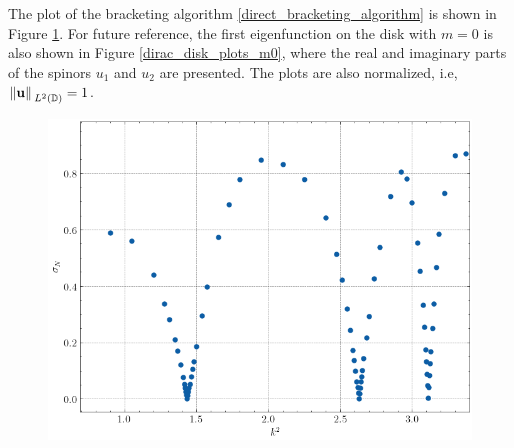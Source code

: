 The plot of the bracketing algorithm \ref{direct_bracketing_algorithm} is shown in Figure \ref{dirac_disk_alg_m0}. For future reference, the first eigenfunction on the disk with \(m=0\) is also shown in Figure \ref{dirac_disk_plots_m0}, where the real and imaginary parts of the spinors \(u_1\) and \(u_2\) are presented. The plots are also normalized, i.e, \(\norm*{\mathbf{u}}_{L^2(\mathbb{D})}=1\).

\begin{figure}[!htb]
    \centering
    \includegraphics[width=0.5\linewidth]{Images/Dirac/circle_m_0_alg_points_158_inner_eta_05.png}
    \label{dirac_disk_alg_m0}
\end{figure}

